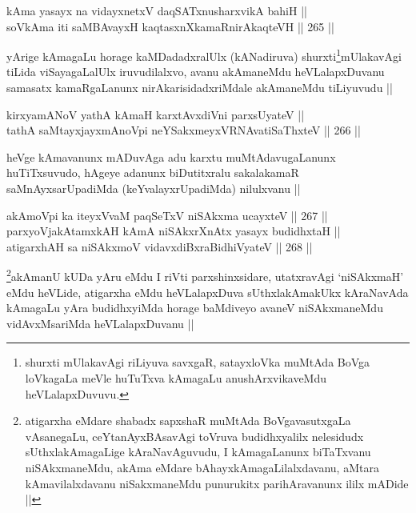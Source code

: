 
\begin{shl}
kAma yasayx na vidayxnetxV daqSATxnusharxvikA bahiH || \\
soV\s kAma iti saMBAvayxH kaqtasxnXkamaRnirAkaqteVH ||  265 ||   
\end{shl}

\begin{artha}
yArige kAmagaLu horage kaMDadadxralUlx (kANadiruva) shurxti\footnote{shurxti mUlakavAgi riLiyuva savxgaR, satayxloVka muMtAda
  BoVga loVkagaLa meVle huTuTxva kAmagaLu anushArxvikaveMdu
  heVLalapxDuvuvu.}mUlakavAgi tiLida viSayagaLalUlx iruvudilalxvo, avanu akAmaneMdu
heVLalapxDuvanu samasatx kamaRgaLanunx nirAkarisidadxriMdale
akAmaneMdu tiLiyuvudu ||
\end{artha}

\begin{shl}
kirxyamANoV yathA kAmaH karxtAvxdiVni parxsUyateV || \\
tathA saMtayxjayxmAnoV\s pi neYSakxmeyxVRNAvatiSaThxteV ||  266 ||  
\end{shl}

\begin{artha}
heVge kAmavanunx mADuvAga adu karxtu muMtAdavugaLanunx huTiTxsuvudo,
hAgeye adanunx biDutitxralu sakalakamaR saMnAyxsarUpadiMda
(keYvalayxrUpadiMda) nilulxvanu ||
\end{artha}


\begin{shl}
akAmoV\s pi ka iteyxVvaM paqSeTxV niSAkxma ucayxteV ||  267 ||  \\
parxyoVjakAtamxkAH kAmA niSAkxrXnAtx yasayx budidhxtaH || \\
atigarxhAH sa niSAkxmoV vidavxdiBxraBidhiVyateV ||  268 ||  
\end{shl}

\begin{artha}
\footnote{atigarxha eMdare shabadx sapxshaR muMtAda BoVgavasutxgaLa
  vAsanegaLu, ceYtanAyxBAsavAgi toVruva budidhxyalilx nelesidudx
  sUthxlakAmagaLige kAraNavAguvudu, I kAmagaLanunx biTaTxvanu
  niSAkxmaneMdu, akAma eMdare bAhayxkAmagaLilalxdavanu, aMtara
  kAmavilalxdavanu niSakxmaneMdu punurukitx parihAravanunx ililx
  mADide ||}akAmanU kUDa yAru eMdu I riVti parxshinxsidare, utatxravAgi
`niSAkxmaH' eMdu heVLide, atigarxha eMdu heVLalapxDuva sUthxlakAmakUkx
kAraNavAda kAmagaLu yAra budidhxyiMda horage baMdiveyo avaneV
niSAkxmaneMdu vidAvxMsariMda heVLalapxDuvanu ||
\end{artha}

